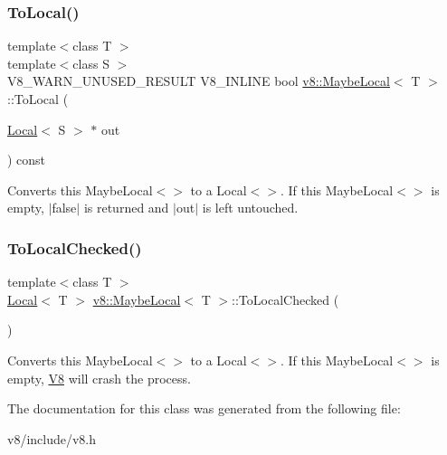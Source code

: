 \subsubsection{\texorpdfstring{To\+Local()}{ToLocal()}}
{\footnotesize\ttfamily template$<$class T $>$ \\
template$<$class S $>$ \\
V8\+\_\+\+W\+A\+R\+N\+\_\+\+U\+N\+U\+S\+E\+D\+\_\+\+R\+E\+S\+U\+LT V8\+\_\+\+I\+N\+L\+I\+NE bool \mbox{\hyperlink{classv8_1_1MaybeLocal}{v8\+::\+Maybe\+Local}}$<$ T $>$\+::To\+Local (\begin{DoxyParamCaption}\item[{\mbox{\hyperlink{classv8_1_1Local}{Local}}$<$ S $>$ $\ast$}]{out }\end{DoxyParamCaption}) const\hspace{0.3cm}{\ttfamily [inline]}}

Converts this Maybe\+Local$<$$>$ to a Local$<$$>$. If this Maybe\+Local$<$$>$ is empty, $\vert$false$\vert$ is returned and $\vert$out$\vert$ is left untouched. \mbox{\label{classv8_1_1MaybeLocal_a9b2c9d50fca5897e3a03fd4c25d12415}} 
\subsubsection{\texorpdfstring{To\+Local\+Checked()}{ToLocalChecked()}}
{\footnotesize\ttfamily template$<$class T $>$ \\
\mbox{\hyperlink{classv8_1_1Local}{Local}}$<$ T $>$ \mbox{\hyperlink{classv8_1_1MaybeLocal}{v8\+::\+Maybe\+Local}}$<$ T $>$\+::To\+Local\+Checked (\begin{DoxyParamCaption}{ }\end{DoxyParamCaption})}

Converts this Maybe\+Local$<$$>$ to a Local$<$$>$. If this Maybe\+Local$<$$>$ is empty, \mbox{\hyperlink{classv8_1_1V8}{V8}} will crash the process. 

The documentation for this class was generated from the following file\+:\begin{DoxyCompactItemize}
\item 
v8/include/v8.\+h\end{DoxyCompactItemize}
